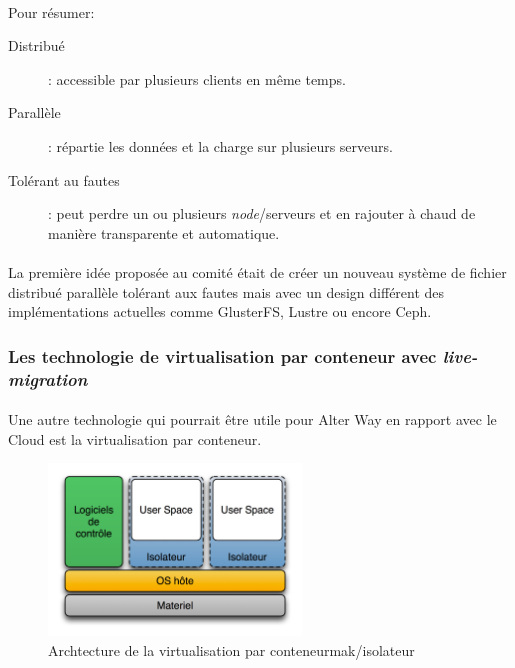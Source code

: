 \paragraph*{}
Pour résumer:
\begin{description}
	\item[Distribué] : accessible par plusieurs clients en même temps.
	\item[Parallèle] : répartie les données et la charge sur plusieurs serveurs.
	\item[Tolérant au fautes]: peut perdre un ou plusieurs \emph{node}/serveurs et en rajouter à chaud de manière transparente et automatique.
\end{description}

\paragraph*{}
La première idée proposée au comité était de créer un nouveau système de fichier distribué parallèle tolérant aux fautes mais avec un design différent des implémentations actuelles
comme GlusterFS, Lustre ou encore Ceph.


\subsubsection{Les technologie de virtualisation par conteneur avec \emph{live-migration}}
\paragraph*{}
Une autre technologie qui pourrait être utile pour Alter Way en rapport avec le Cloud est la virtualisation par conteneur.

\begin{figure}[H]
\centering
\includegraphics[width=0.6\textwidth]{resource/img/Diagramme_ArchiIsolateur}
\caption{Archtecture de la virtualisation par conteneurmak/isolateur}
\end{figure}

